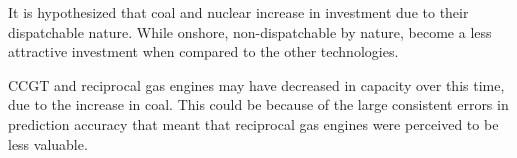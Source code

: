 \documentclass[final,3p,times,twocolumn,numbers]{elsarticle}
\begin{document}
It is hypothesized that coal and nuclear increase in investment due to their dispatchable nature. While onshore, non-dispatchable by nature, become a less attractive investment when compared to the other technologies.

CCGT and reciprocal gas engines may have decreased in capacity over this time, due to the increase in coal. This could be because of the large consistent errors in prediction accuracy that meant that reciprocal gas engines were perceived to be less valuable.


\end{document}
